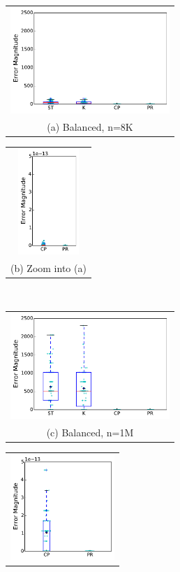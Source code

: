 \begin{figure}[!htb]
\centering
{}
\begin{tabular}{c}
\includegraphics[width=\textwidth,
  height=4cm]{chapter_2_figures/draft_boxplot_balanced_N=8192.pdf} \\ (a)
Balanced, n=8K \\
\end{tabular}
\endminipage 
{}
\begin{tabular}{c}
\includegraphics[width=\textwidth,
  height=4cm]{chapter_2_figures/draft_boxplot_balanced_cp_vs_preround_N=8192.pdf}
\\ (b) Zoom into (a) \\
\end{tabular}
\endminipage 
 \\
\begin{tabular}{c}
\includegraphics[width=\textwidth, height=4cm]{chapter_2_figures/draft_boxplot_balanced_N=1048576.pdf} \\
(c) Balanced, n=1M\\
\end{tabular}
\endminipage 
{}
\begin{tabular}{c}
\includegraphics[width=\textwidth, height=4cm]{chapter_2_figures/draft_boxplot_balanced_cp_vs_preround_N=1048576.pdf} \\

\end{tabular}
\end{figure}
